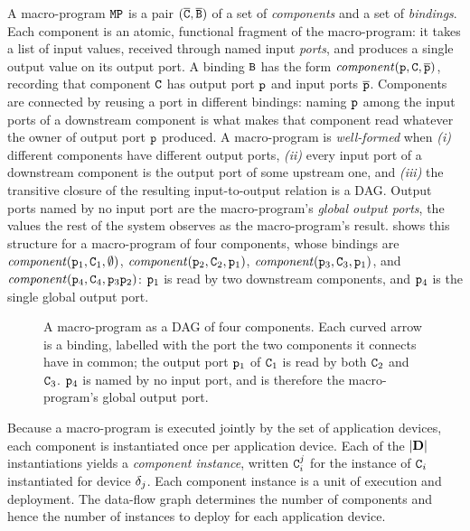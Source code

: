 A macro-program $\mathtt{MP}$ is a pair $(\overline{\mathtt{C}},\overline{\mathtt{B}})$ of a set of \emph{components} and a set of \emph{bindings}.
%
Each component is an atomic,
functional fragment of the macro-program:
it takes a list of input values, received through named input \emph{ports},
and produces a single output value on its output port.
%
A binding $\mathtt{B}$ has the form $\mathit{component}(\mathtt{p},\mathtt{C},\overline{\mathtt{p}})$,
recording that component $\mathtt{C}$ has output port $\mathtt{p}$ and input ports $\overline{\mathtt{p}}$.
Components are connected by reusing a port in different bindings:
naming $\mathtt{p}$ among the input ports of a downstream component is what makes that component read whatever the owner of output port $\mathtt{p}$ produced.
%
A macro-program is \emph{well-formed} when
\emph{(i)} different components have different output ports,
\emph{(ii)} every input port of a downstream component is the output port of some upstream one,
and \emph{(iii)} the transitive closure of the resulting input-to-output relation is a \ac{DAG}.
%
Output ports named by no input port are the macro-program's \emph{global output ports},
the values the rest of the system observes as the macro-program's result.
%
 shows this structure for a macro-program of four components,
whose bindings are
$\mathit{component}(\mathtt{p}_1,\mathtt{C}_1,\emptyset)$,
$\mathit{component}(\mathtt{p}_2,\mathtt{C}_2,\mathtt{p}_1)$,
$\mathit{component}(\mathtt{p}_3,\mathtt{C}_3,\mathtt{p}_1)$,
and $\mathit{component}(\mathtt{p}_4,\mathtt{C}_4,\mathtt{p}_3\mathtt{p}_2)$:
$\mathtt{p}_1$ is read by two downstream components, and $\mathtt{p}_4$ is the single global output port.

\begin{figure}[t]
    \centering
    
    \caption[A macro-program as a DAG of components]{A macro-program as a DAG of four components. Each curved arrow is a binding, labelled with the port the two components it connects have in common; the output port $\mathtt{p}_1$ of $\mathtt{C}_1$ is read by both $\mathtt{C}_2$ and $\mathtt{C}_3$. $\mathtt{p}_4$ is named by no input port, and is therefore the macro-program's global output port.}
    \label{fig:macro-program-dag}
\end{figure}

Because a macro-program is executed jointly by the set of application devices,
each component is instantiated once per application device.
Each of the $|\mathbf{D}|$ instantiations yields a \emph{component instance},
written $\mathtt{C}_i^j$ for the instance of $\mathtt{C}_i$ instantiated for device $\delta_j$.
Each component instance is a unit of execution and deployment.
%
The data-flow graph determines the number of components and hence the number of instances to deploy for each application device.

